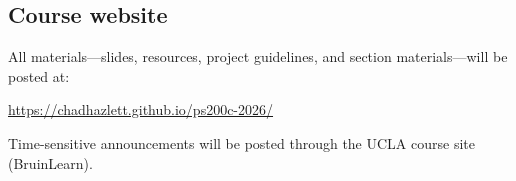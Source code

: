 \documentclass[PS]{syllabus}
\begin{document}
\begin{syllabus}
\section*{Course website}

All materials---slides, resources, project guidelines, and section materials---will be posted at:

\begin{center}
\url{https://chadhazlett.github.io/ps200c-2026/}
\end{center}

Time-sensitive announcements will be posted through the UCLA course site (BruinLearn).

\end{syllabus}
\end{document}
